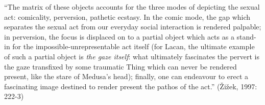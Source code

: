 \documentclass{scrartcl}
\begin{document}
	\vspace{0.15cm}
	
	{\small ``The matrix of these objects accounts for the three modes of depicting the sexual act: comicality, perversion, pathetic ecstasy. In the comic mode, the gap which separates the sexual act from our everyday social interaction is rendered palpable; in perversion, the focus is displaced on to a partial object which acts as a stand-in for the impossible-unrepresentable act itself (for Lacan, the ultimate example of such a partial object is \textit{the gaze itself}: what ultimately fascinates the pervert is the gaze transfixed by some traumatic Thing which can never be rendered present, like the stare of Medusa's head); finally, one can endeavour to erect a fascinating image destined to render present the pathos of the act.'' (\v{Z}i\v{z}ek, 1997: 222-3)}
\end{document}
